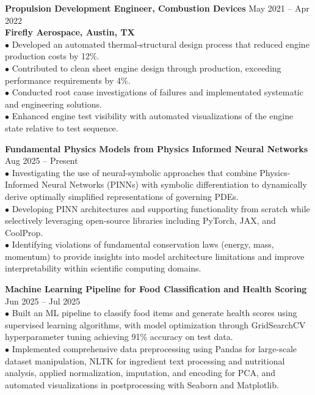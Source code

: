 \documentclass[10pt]{article}
\renewcommand{\section}[2]%
        {\pagebreak[3]\vspace{1.1\baselineskip}%
         \phantomsection\addcontentsline{toc}{section}{#1}%
         \hspace{0in}%
         \marginpar{
         \raggedright \small \scshape #1}#2}
\newcommand{\blankline}{\quad\pagebreak[2]\vspace{-0.3\baselineskip}}
\begin{document}
\blankline

\textbf{Propulsion Development Engineer, Combustion Devices}
\hfill May 2021 -- Apr 2022 \\
\textbf{Firefly Aerospace, Austin, TX} \\
$\bullet$ Developed an automated thermal-structural design process that reduced engine production costs by 12\%. \\
$\bullet$ Contributed to clean sheet engine design through production, exceeding performance requirements by 4\%. \\
$\bullet$ Conducted root cause investigations of failures and implementated systematic and engineering solutions. \\ 
$\bullet$ Enhanced engine test visibility with automated visualizations of the engine state relative to test sequence.



\section{Projects}
\textbf{Fundamental Physics Models from Physics Informed Neural Networks}
\hfill Aug 2025 -- Present \\ 
$\bullet$ Investigating the use of neural-symbolic approaches that combine Physics-Informed Neural Networks (PINNs) with symbolic differentiation to dynamically derive optimally simplified representations of governing PDEs. \\
$\bullet$ Developing PINN architectures and supporting functionality from scratch while selectively leveraging open-source libraries including PyTorch, JAX, and CoolProp. \\
$\bullet$ Identifying violations of fundamental conservation laws (energy, mass, momentum) to provide insights into model architecture limitations and improve interpretability within scientific computing domains.

\blankline

\textbf{Machine Learning Pipeline for Food Classification and Health Scoring}
\hfill Jun 2025 -- Jul 2025 \\ 
$\bullet$ Built an ML pipeline to classify food items and generate health scores using supervised learning algorithms, with model optimization through GridSearchCV hyperparameter tuning achieving 91\% accuracy on test data. \\
$\bullet$ Implemented comprehensive data preprocessing using Pandas for large-scale dataset manipulation, NLTK for ingredient text processing and nutritional analysis, applied normalization, imputation, and encoding for PCA, and automated visualizations in postprocessing with Seaborn and Matplotlib.
\end{document}
